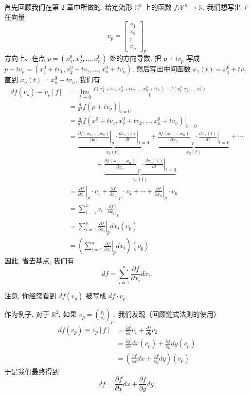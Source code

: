 首先回顾我们在第 2 章中所做的. 给定流形 $\mathbb{R}^n$ 上的函数 $f:\mathbb{R}^n\to\mathbb{R}$, 我们想写出 $f$ 在向量
\[
v_p=\begin{bmatrix}v_1\\v_2\\\vdots\\v_n\end{bmatrix}_p
\]
方向上、在点 $p=(x_1^0,x_2^0,\ldots,x_n^0)$ 处的方向导数. 把 $p+tv_p$ 写成 $p+tv_p=(x_1^0+tv_1,x_2^0+tv_2,\ldots,x_n^0+tv_n)$, 然后写出中间函数 $x_1(t)=x_1^0+tv_1$ 直到 $x_n(t)=x_n^0+tv_n$, 我们有
\begin{align*}
df(v_p)\equiv v_p[f]
&=\lim_{t\to 0}\frac{f(x_1^0+tv_1,x_2^0+tv_2,\ldots,x_n^0+tv_n)-f(x_1^0,x_2^0,\ldots,x_n^0)}{t}\\
&=\left.\frac{d}{dt}f(p+tv_p)\right|_{t=0}\\
&=\left.\frac{d}{dt}f(x_1^0+tv_1,x_2^0+tv_2,\ldots,x_n^0+tv_n)\right|_{t=0}\\
&=\underbrace{\left.\frac{\partial f(x_1,\ldots,x_n)}{\partial x_1}\right|_p\cdot\left.\frac{dx_1(t)}{dt}\right|_{t=0}}_{x_1(t)}
+\underbrace{\left.\frac{\partial f(x_1,\ldots,x_n)}{\partial x_2}\right|_p\cdot\left.\frac{dx_2(t)}{dt}\right|_{t=0}}_{x_2(t)}
+\cdots\\
&\qquad\qquad+\underbrace{\left.\frac{\partial f(x_1,\ldots,x_n)}{\partial x_n}\right|_p\cdot\left.\frac{dx_n(t)}{dt}\right|_{t=0}}_{x_n(t)}\\
&=\left.\frac{\partial f}{\partial x_1}\right|_p\cdot v_1+\left.\frac{\partial f}{\partial x_2}\right|_p\cdot v_2+\cdots+\left.\frac{\partial f}{\partial x_n}\right|_p\cdot v_n\\
&=\sum_{i=1}^{n}v_i\cdot\left.\frac{\partial f}{\partial x_i}\right|_p\\
&=\sum_{i=1}^{n}\left.\frac{\partial f}{\partial x_i}\right|_p dx_i(v_p)\\
&=\left(\sum_{i=1}^{n}\left.\frac{\partial f}{\partial x_i}\right|_p dx_i\right)(v_p)
\end{align*}
因此, 省去基点, 我们有
\[
df=\sum_{i=1}^{n}\frac{\partial f}{\partial x_i}dx_i.
\]

注意, 你经常看到 $df(v_p)$ 被写成 $df\cdot v_p$.

作为例子, 对于 $\mathbb{R}^2$, 如果 $v_p=\binom{v_1}{v_2}_{\!p}$, 我们发现（回顾链式法则的使用）
\begin{align*}
df(v_p)\equiv v_p[f]
&=\frac{\partial f}{\partial x}v_1+\frac{\partial f}{\partial y}v_2\\
&=\frac{\partial f}{\partial x}dx(v_p)+\frac{\partial f}{\partial y}dy(v_p)\\
&=\left(\frac{\partial f}{\partial x}dx+\frac{\partial f}{\partial y}dy\right)(v_p)
\end{align*}
于是我们最终得到
\[
df=\frac{\partial f}{\partial x}dx+\frac{\partial f}{\partial y}dy.
\]

